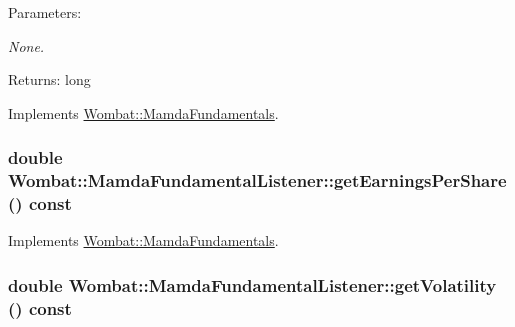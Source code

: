 \begin{Desc}
\item[Parameters:]
\begin{description}
\item[{\em None.}]\end{description}
\end{Desc}
\begin{Desc}
\item[Returns:]long\end{Desc}


Implements \hyperlink{classWombat_1_1MamdaFundamentals_69967f29f8189a0e9775aa475568a5a7}{Wombat::Mamda\-Fundamentals}.\hypertarget{classWombat_1_1MamdaFundamentalListener_e4219dceb76af963348acab9b9a27246}{
\subsubsection[getEarningsPerShare]{\setlength{\rightskip}{0pt plus 5cm}double Wombat::Mamda\-Fundamental\-Listener::get\-Earnings\-Per\-Share () const}}
\label{classWombat_1_1MamdaFundamentalListener_e4219dceb76af963348acab9b9a27246}




Implements \hyperlink{classWombat_1_1MamdaFundamentals_7e942012bd9711d3bde88b1da09be638}{Wombat::Mamda\-Fundamentals}.\hypertarget{classWombat_1_1MamdaFundamentalListener_641fd03980bd391579bb99ac1393594e}{
\subsubsection[getVolatility]{\setlength{\rightskip}{0pt plus 5cm}double Wombat::Mamda\-Fundamental\-Listener::get\-Volatility () const}}
\label{classWombat_1_1MamdaFundamentalListener_641fd03980bd391579bb99ac1393594e}




